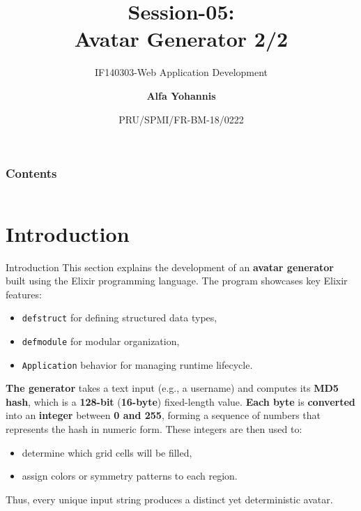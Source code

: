\documentclass[aspectratio=169, table]{beamer}
\subtitle{IF140303-Web Application Development}
\title{Session-05:\\
\Huge{
Avatar Generator 2/2\\
\vspace{5pt}
}
}
\date[Serial]{\scriptsize{PRU/SPMI/FR-BM-18/0222}}
\author[Pradita]{\small{\textbf{Alfa Yohannis}}}
\begin{document}
	
	\frame{\titlepage}
	
		\begin{frame}[fragile]
		\frametitle{Contents}
		\vspace{20pt}
		\begin{columns}[t]
			\tableofcontents[sections={1-6}]
			
			\tableofcontents[sections={7-99}]
		\end{columns}
	\end{frame}


\section{Introduction}

\begin{frame}[fragile]{Introduction}
\vspace{20pt}
This section explains the development of an \textbf{avatar generator} built using the Elixir programming language.  
The program showcases key Elixir features:
\begin{itemize}
  \item \texttt{defstruct} for defining structured data types,
  \item \texttt{defmodule} for modular organization,
  \item \texttt{Application} behavior for managing runtime lifecycle.
\end{itemize}

\textbf{The generator} takes a text input (e.g., a username) and computes its \textbf{MD5 hash}, which is a \textbf{128-bit} (\textbf{16-byte}) fixed-length value.  
\textbf{Each byte} is \textbf{converted} into an \textbf{integer }between \textbf{0 and 255}, forming a sequence of numbers that represents the hash in numeric form.  
These integers are then used to:
\begin{itemize}
  \item determine which grid cells will be filled,
  \item assign colors or symmetry patterns to each region.
\end{itemize}
Thus, every unique input string produces a distinct yet deterministic avatar.
\end{frame}
\end{document}
